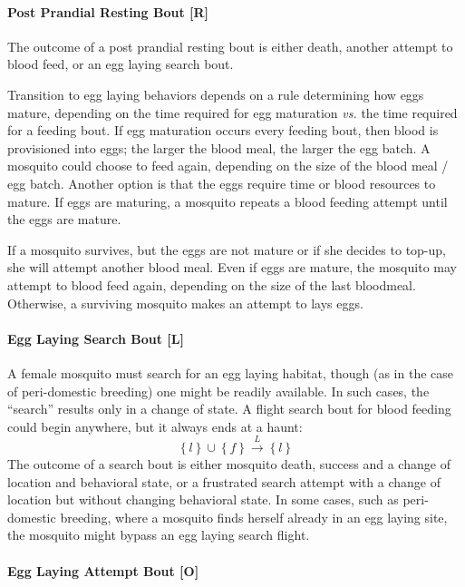 \documentclass{article}
\begin{document}
\paragraph{Post Prandial Resting Bout [R]}

The outcome of a post prandial resting bout is either death, another attempt to blood feed, or an egg laying search bout.

Transition to egg laying behaviors depends on a rule determining how eggs mature, depending on the time required for egg maturation {\em vs.} the time required for a feeding bout. If egg maturation occurs every feeding bout, then blood is provisioned into eggs; the larger the blood meal, the larger the egg batch. A mosquito could choose to feed again, depending on the size of the blood meal / egg batch. Another option is that the eggs require time or blood resources to mature. If eggs are maturing, a mosquito repeats a blood feeding attempt until the eggs are mature.

If a mosquito survives, but the eggs are not mature or if she decides to top-up, she will attempt another blood meal. Even if eggs are mature, the mosquito may attempt to blood feed again, depending on the size of the last bloodmeal. Otherwise, a surviving mosquito makes an attempt to lays eggs. 

\paragraph{Egg Laying Search Bout [L]}

A female mosquito must search for an egg laying habitat, though (as in the case of peri-domestic breeding) one might be readily available. In such cases, the ``search'' results only in a change of state. A flight search bout for blood feeding could begin anywhere, but it always ends at a haunt:
%
\begin{equation}
%
\left\{ l\right\}  \cup \left\{ f\right\}  \overset{L}{\rightarrow} \left\{ l\right\} 
%
\end{equation}
%
The outcome of a search bout is either mosquito death, success and a change of location and behavioral state, or a frustrated search attempt with a change of location but without changing behavioral state. In some cases, such as peri-domestic breeding, where a mosquito finds herself already in an egg laying site, the mosquito might bypass an egg laying search flight. 

\paragraph{Egg Laying Attempt Bout [O]}
\end{document}

